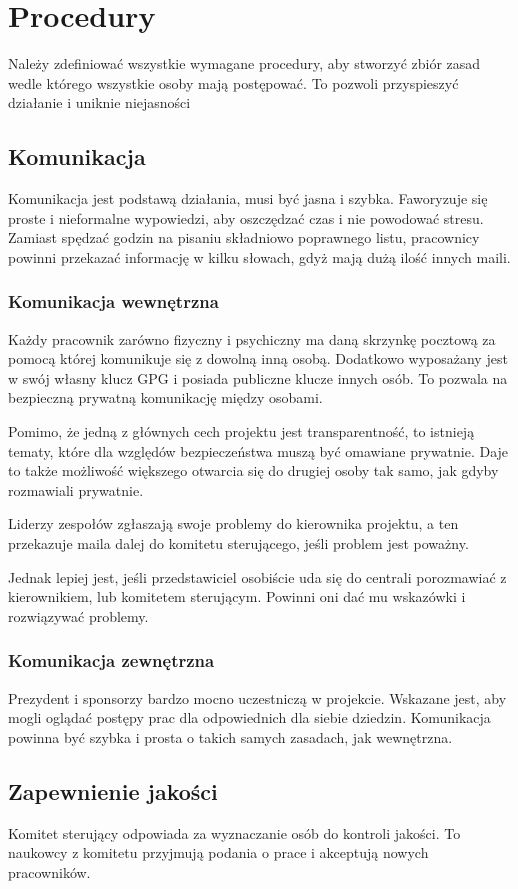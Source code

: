 \section{Procedury}
Należy zdefiniować wszystkie wymagane procedury, aby stworzyć zbiór zasad wedle którego wszystkie osoby mają postępować.
To pozwoli przyspieszyć działanie i uniknie niejasności
\subsection{Komunikacja}
Komunikacja jest podstawą działania, musi być jasna i szybka. Faworyzuje się proste i nieformalne wypowiedzi, aby oszczędzać czas i nie powodować stresu.
Zamiast spędzać godzin na pisaniu składniowo poprawnego listu, pracownicy powinni przekazać informację w kilku słowach, gdyż mają dużą ilość innych maili.
\subsubsection{Komunikacja wewnętrzna}
Każdy pracownik zarówno fizyczny i psychiczny ma daną skrzynkę pocztową za pomocą której komunikuje się z dowolną inną osobą.
Dodatkowo wyposażany jest w swój własny klucz GPG i posiada publiczne klucze innych osób.
To pozwala na bezpieczną prywatną komunikację między osobami.

Pomimo, że jedną z głównych cech projektu jest transparentność, to istnieją tematy, które dla względów bezpieczeństwa muszą być omawiane prywatnie.
Daje to także możliwość większego otwarcia się do drugiej osoby tak samo, jak gdyby rozmawiali prywatnie.

Liderzy zespołów zgłaszają swoje problemy do kierownika projektu, a ten przekazuje maila dalej do komitetu sterującego, jeśli problem jest poważny.

Jednak lepiej jest, jeśli przedstawiciel osobiście uda się do centrali porozmawiać z kierownikiem, lub komitetem sterującym.
Powinni oni dać mu wskazówki i rozwiązywać problemy.

\subsubsection{Komunikacja zewnętrzna}
Prezydent i sponsorzy bardzo mocno uczestniczą w projekcie. Wskazane jest, aby mogli oglądać postępy prac dla odpowiednich dla siebie dziedzin.
Komunikacja powinna być szybka i prosta o takich samych zasadach, jak wewnętrzna.

\subsection{Zapewnienie jakości}
Komitet sterujący odpowiada za wyznaczanie osób do kontroli jakości.
To naukowcy z komitetu przyjmują podania o prace i akceptują nowych pracowników.

